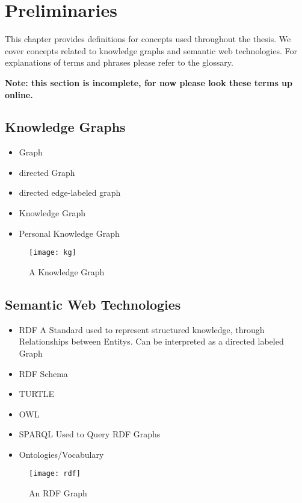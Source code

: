 \chapter{Preliminaries} \label{ch:preliminaries}
This chapter provides definitions for concepts used throughout the thesis. We cover concepts related to knowledge graphs and semantic web technologies. For explanations of terms and phrases please refer to the glossary.

\textbf{Note: this section is incomplete, for now please look these terms up online.}

\section{Knowledge Graphs}

\begin{itemize}
    \item Graph
    \item directed Graph
    \item directed edge-labeled graph
    \item Knowledge Graph
    \item Personal Knowledge Graph
\end{itemize}

\begin{figure}[H]
    \centering
    \texttt{[image: kg]}
    \caption[]{A Knowledge Graph}
\end{figure}

\section{Semantic Web Technologies}

\begin{itemize}
    \item RDF A Standard used to represent structured knowledge, through Relationships between Entitys. Can be interpreted as a directed labeled Graph
    \item RDF Schema
    \item TURTLE
    \item OWL 
    \item SPARQL Used to Query RDF Graphs
    \item Ontologies/Vocabulary
\end{itemize}

\begin{figure}[H]
    \centering
    \texttt{[image: rdf]}
    \caption[]{An RDF Graph}
\end{figure}

